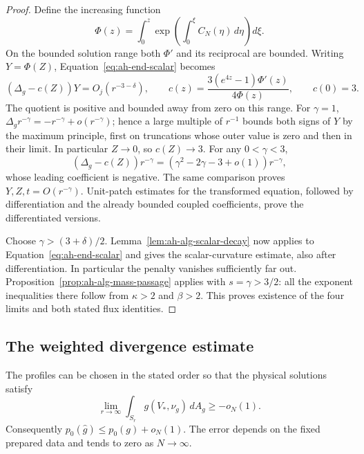 \begin{proof}
Define the increasing function
\[
 \Phi(z)=\int_0^z\exp\!\left(\int_0^\xi C_N(\eta)\,d\eta\right)d\xi .
\]
On the bounded solution range both \(\Phi'\) and its reciprocal are
bounded. Writing \(Y=\Phi(Z)\), Equation~\eqref{eq:ah-end-scalar}
becomes
\[
 (\Delta_g-c(Z))Y=O_j(r^{-3-\delta}),\qquad
 c(z)=\frac{3(e^{4z}-1)\Phi'(z)}{4\Phi(z)},\qquad c(0)=3.
\]
The quotient is positive and bounded away from zero on this range.
For \(\gamma=1\),
\(\Delta_g r^{-\gamma}=-r^{-\gamma}+o(r^{-\gamma})\);
hence a large multiple of \(r^{-1}\) bounds both signs of \(Y\)
by the maximum principle, first on truncations whose outer value is
zero and then in their limit. In particular \(Z\to0\), so \(c(Z)\to3\).
For any \(0<\gamma<3\),
\[
 (\Delta_g-c(Z))r^{-\gamma}
   =(\gamma^2-2\gamma-3+o(1))r^{-\gamma},
\]
whose leading coefficient is negative. The same comparison proves
\(Y,Z,t=O(r^{-\gamma})\). Unit-patch estimates for the transformed
equation, followed by differentiation and the already bounded coupled
coefficients, prove the differentiated versions.

Choose \(\gamma>(3+\delta)/2\).
Lemma~\ref{lem:ah-alg-scalar-decay} now applies to
Equation~\eqref{eq:ah-end-scalar} and gives the scalar-curvature
estimate, also after differentiation.
In particular the penalty vanishes sufficiently far out.
Proposition~\ref{prop:ah-alg-mass-passage} applies with
\(s=\gamma>3/2\): all the exponent inequalities there follow from
\(\kappa>2\) and \(\beta>2\). This proves existence of the four limits
and both stated flux identities.
\end{proof}

\subsection{The weighted divergence estimate}
\label{subsec:ah-mass-estimate}

\begin{proposition}
\label{prop:ah-mass-loss}
The profiles can be chosen in the stated order so that the physical
solutions satisfy
\[
 \lim_{r\to\infty}\int_{S_r}g(V_*,\nu_g)\,dA_g\ge-o_N(1).
\]
Consequently \(p_0(\widehat g)\le p_0(g)+o_N(1)\).
The error depends on the fixed prepared data and tends to zero as
\(N\to\infty\).
\end{proposition}

